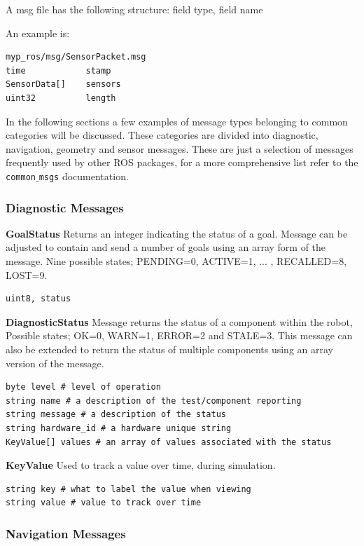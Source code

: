 \documentclass[twoside]{article}
\begin{document}
A msg file has the following structure: field type, field name

An example is:
\begin{verbatim}
myp_ros/msg/SensorPacket.msg
time            stamp
SensorData[]    sensors
uint32          length
\end{verbatim}

In the following sections a few examples of message types belonging to common categories will be discussed. These categories are divided into diagnostic, navigation, geometry and sensor messages. These are just a selection of messages frequently used by other ROS packages, for a more comprehensive list refer to the \texttt{common$\_$msgs} documentation.


\subsubsection{Diagnostic Messages}
\textbf{GoalStatus}\newline
Returns an integer indicating the status of a goal. Message can be adjusted to contain and send a number of goals using an array form of the message. Nine possible states; PENDING=0, ACTIVE=1, ... , RECALLED=8, LOST=9.
\begin{verbatim}
uint8, status
\end{verbatim}

\textbf{DiagnosticStatus} \newline
Message returns the status of a component within the robot, Possible states; OK=0, WARN=1, ERROR=2 and STALE=3. This message can also be extended to return the status of multiple components using an array version of the message.
\begin{verbatim}
byte level # level of operation
string name # a description of the test/component reporting
string message # a description of the status
string hardware_id # a hardware unique string
KeyValue[] values # an array of values associated with the status
\end{verbatim}

\textbf{KeyValue} \newline
Used to track a value over time, during simulation.
\begin{verbatim}
string key # what to label the value when viewing
string value # value to track over time
\end{verbatim}

\subsubsection{Navigation Messages}
\end{document}
